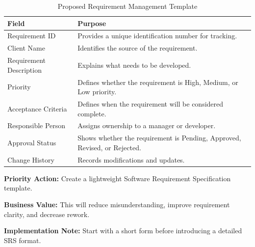 \documentclass[12pt,a4paper]{report}
\begin{document}
\begin{table}[H]
\centering
\caption{Proposed Requirement Management Template}
\renewcommand{\arraystretch}{1.3}
\begin{tabularx}{\textwidth}{|p{4cm}|X|}
\hline
\rowcolor{secondary}
\textbf{Field} & \textbf{Purpose} \\
\hline
Requirement ID & Provides a unique identification number for tracking. \\
\hline
Client Name & Identifies the source of the requirement. \\
\hline
Requirement Description & Explains what needs to be developed. \\
\hline
Priority & Defines whether the requirement is High, Medium, or Low priority. \\
\hline
Acceptance Criteria & Defines when the requirement will be considered complete. \\
\hline
Responsible Person & Assigns ownership to a manager or developer. \\
\hline
Approval Status & Shows whether the requirement is Pending, Approved, Revised, or Rejected. \\
\hline
Change History & Records modifications and updates. \\
\hline
\end{tabularx}
\end{table}

\begin{recommendBox}
\textbf{Priority Action:} Create a lightweight Software Requirement Specification template.

\textbf{Business Value:} This will reduce misunderstanding, improve requirement clarity, and decrease rework.

\textbf{Implementation Note:} Start with a short form before introducing a detailed SRS format.
\end{recommendBox}
\end{document}
